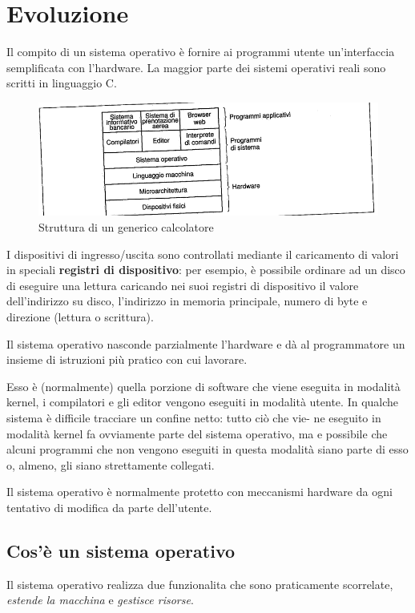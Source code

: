 \chapter{Evoluzione}
\thispagestyle{empty}
Il compito di un sistema operativo è fornire ai programmi utente un'interfaccia semplificata con l'hardware.
La maggior parte dei sistemi operativi reali sono scritti in linguaggio C.

\begin{figure}[h!]
    \centering
    \includegraphics[width=0.7\linewidth]{assets/calcolatore1.png}
    \caption{Struttura di un generico calcolatore}
\end{figure}

I dispositivi di ingresso/uscita sono controllati mediante il caricamento di valori in speciali \textbf{registri di dispositivo}: per esempio, è possibile ordinare ad un disco di eseguire una lettura caricando nei suoi registri di dispositivo il valore dell'indirizzo su disco, l'indirizzo in memoria principale, numero di byte e direzione (lettura o scrittura).

Il sistema operativo nasconde parzialmente l'hardware e dà al programmatore un insieme di istruzioni più pratico con cui lavorare.

Esso è (normalmente) quella porzione di software che viene eseguita in modalità kernel, i compilatori e gli editor vengono eseguiti in modalità utente.
In qualche sistema è difficile tracciare un confine netto: tutto ciò che vie-
ne eseguito in modalità kernel fa ovviamente parte del sistema operativo, ma e possibile che alcuni programmi che non vengono eseguiti in questa modalità siano parte di esso o, almeno, gli siano strettamente collegati.

Il sistema operativo è normalmente protetto con meccanismi hardware da ogni tentativo di modifica da parte dell'utente.

\section{Cos'è un sistema operativo}
Il sistema operativo realizza due funzionalita che sono praticamente scorrelate, \textit{estende la macchina} e \textit{gestisce risorse}.

